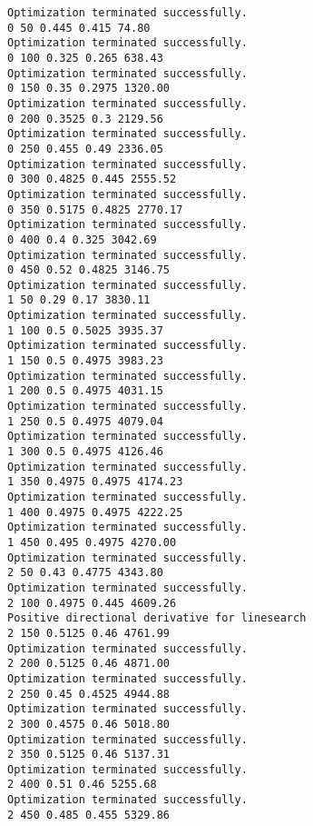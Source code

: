 \documentclass[11pt]{article}
\begin{document}
    \begin{Verbatim}[commandchars=\\\{\}]
Optimization terminated successfully.
0 50 0.445 0.415 74.80
Optimization terminated successfully.
0 100 0.325 0.265 638.43
Optimization terminated successfully.
0 150 0.35 0.2975 1320.00
Optimization terminated successfully.
0 200 0.3525 0.3 2129.56
Optimization terminated successfully.
0 250 0.455 0.49 2336.05
Optimization terminated successfully.
0 300 0.4825 0.445 2555.52
Optimization terminated successfully.
0 350 0.5175 0.4825 2770.17
Optimization terminated successfully.
0 400 0.4 0.325 3042.69
Optimization terminated successfully.
0 450 0.52 0.4825 3146.75
Optimization terminated successfully.
1 50 0.29 0.17 3830.11
Optimization terminated successfully.
1 100 0.5 0.5025 3935.37
Optimization terminated successfully.
1 150 0.5 0.4975 3983.23
Optimization terminated successfully.
1 200 0.5 0.4975 4031.15
Optimization terminated successfully.
1 250 0.5 0.4975 4079.04
Optimization terminated successfully.
1 300 0.5 0.4975 4126.46
Optimization terminated successfully.
1 350 0.4975 0.4975 4174.23
Optimization terminated successfully.
1 400 0.4975 0.4975 4222.25
Optimization terminated successfully.
1 450 0.495 0.4975 4270.00
Optimization terminated successfully.
2 50 0.43 0.4775 4343.80
Optimization terminated successfully.
2 100 0.4975 0.445 4609.26
Positive directional derivative for linesearch
2 150 0.5125 0.46 4761.99
Optimization terminated successfully.
2 200 0.5125 0.46 4871.00
Optimization terminated successfully.
2 250 0.45 0.4525 4944.88
Optimization terminated successfully.
2 300 0.4575 0.46 5018.80
Optimization terminated successfully.
2 350 0.5125 0.46 5137.31
Optimization terminated successfully.
2 400 0.51 0.46 5255.68
Optimization terminated successfully.
2 450 0.485 0.455 5329.86

    \end{Verbatim}
\end{document}
